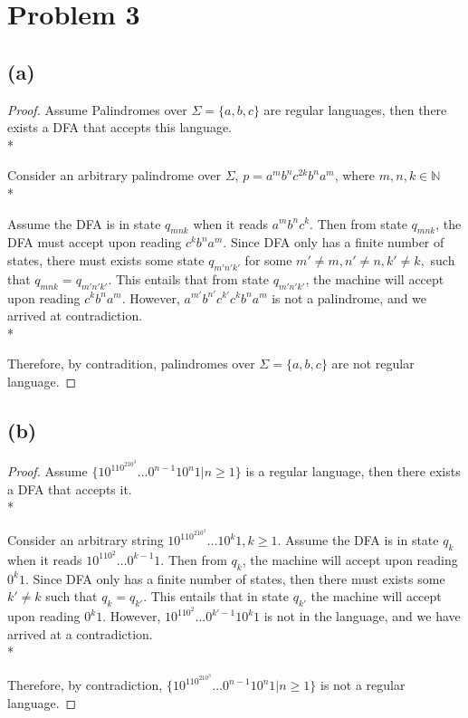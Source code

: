 \documentclass{article}
\begin{document}
\section*{Problem 3}
\subsection*{(a)}
\begin{proof}
    Assume Palindromes over $\Sigma=\{a,b,c\}$ are regular languages, then there exists a DFA that accepts this language.\\*

    Consider an arbitrary palindrome over $\Sigma$, $p=a^mb^nc^{2k}b^na^m$, where $m,n,k \in \mathbb{N} $\\*

    Assume the DFA is in state $q_{mnk}$ when it reads $a^mb^nc^k$. Then from state $q_{mnk}$, the DFA must accept upon reading $c^kb^na^m$. Since DFA only has 
    a finite number of states, there must exists some state $q_{m'n'k'}$ for some $ m'\neq m, n' \neq n, k' \neq k, $ such that $q_{mnk}=q_{m'n'k'}$. This entails that from state $q_{m'n'k'}$, the machine
    will accept upon reading $c^kb^na^m$. However, $a^{m'}b^{n'}c^{k'}c^kb^na^m$ is not a palindrome, and we arrived at contradiction.\\*

    Therefore, by contradition, palindromes over $\Sigma=\{a,b,c\}$ are not regular language.
\end{proof}
\subsection*{(b)}
\begin{proof}
    Assume $\{10^110^210^3\dots0^{n-1}10^n1|n\ge 1\}$ is a regular language, then there exists a DFA that accepts it.\\*

    Consider an arbitrary string $10^110^210^3\dots10^k1, k \ge 1$. Assume the DFA is in state $q_k$ when it reads $10^110^2\dots0^{k-1}1$. Then from $q_k$, the machine will
    accept upon reading $0^k1$. Since DFA only has a finite number of states, then there must exists some $k' \neq k$ such that 
    $q_k = q_{k'}$. This entails that in state $q_{k'}$ the machine will accept upon reading $0^k1$. However, $10^110^2\dots0^{k'-1}10^k1$ is not in the language,
    and we have arrived at a contradiction.\\*

    Therefore, by contradiction, $\{10^110^210^3\dots0^{n-1}10^n1|n\ge 1\}$ is not a regular language.
\end{proof}
\end{document}

